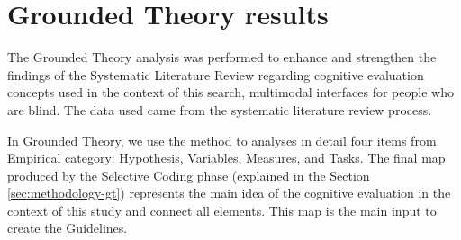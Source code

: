 




\section{Grounded Theory results}
\label{sec:results-gt}
The Grounded Theory analysis was performed to enhance and strengthen the findings of the Systematic Literature Review regarding cognitive evaluation concepts used in the context of this search, multimodal interfaces for people who are blind. The data used came from the systematic literature review process. 

In Grounded Theory, we use the method to analyses in detail four items from Empirical category: Hypothesis, Variables, Measures, and Tasks. The final map produced by the Selective Coding phase (explained in the Section \ref{sec:methodology-gt}) represents the main idea of the cognitive evaluation in the context of this study and connect all elements. This map is the main input to create the Guidelines.

